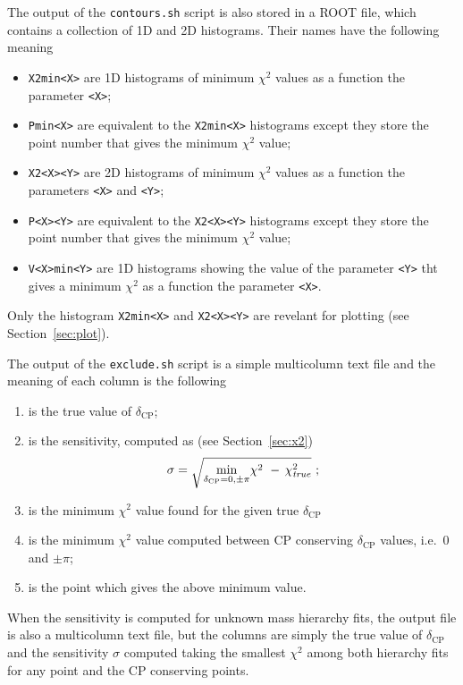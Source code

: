 \documentclass[a4paper, 11pt]{article}
\newcommand{\refsec}[1]{Section~\ref{#1}}
\begin{document}
The output of the \texttt{contours.sh} script is also stored in a ROOT file, which %
contains a collection of 1D and 2D histograms.
Their names have the following meaning
\begin{itemize}
	\item \texttt{X2min<X>} are 1D histograms of minimum $\chi^2$ values as a function %
		the parameter \texttt{<X>};
	\item \texttt{Pmin<X>} are equivalent to the \texttt{X2min<X>} histograms except they %
		store the point number that gives the minimum $\chi^2$ value;
	\item \texttt{X2<X><Y>} are 2D histograms of minimum $\chi^2$ values as a function %
		the parameters \texttt{<X>} and \texttt{<Y>};
	\item \texttt{P<X><Y>} are equivalent to the \texttt{X2<X><Y>} histograms except they %
		store the point number that gives the minimum $\chi^2$ value;
	\item \texttt{V<X>min<Y>} are 1D histograms showing the value of the parameter \texttt{<Y>} %
		tht gives a minimum $\chi^2$ as a function the parameter \texttt{<X>}.
\end{itemize}
Only the histogram \texttt{X2min<X>} and \texttt{X2<X><Y>} are revelant for plotting (see \refsec{sec:plot}).

The output of the \texttt{exclude.sh} script is a simple multicolumn text file %
and the meaning of each column is the following
\begin{enumerate}
	\item is the true value of $\delta_\text{CP}$;
	\item is the sensitivity, computed as (see \refsec{sec:x2})
		\[
			\sigma = \sqrt{\min_{\delta_\text{CP} = 0,\pm\pi}\! \chi^2\  -\,\chi^2_\text{\emph{true}}}\ ;
		\]
	\item is the minimum $\chi^2$ value found for the given true $\delta_\text{CP}$
	\item is the minimum $\chi^2$ value computed between CP conserving $\delta_\text{CP}$ values, %
		i.e.\ $0$ and $\pm\pi$;
	\item is the point which gives the above minimum value.
\end{enumerate}
When the sensitivity is computed for unknown mass hierarchy fits, the output file is %
also a multicolumn text file, but the columns are simply the true value of $\delta_\text{CP}$ %
and the sensitivity $\sigma$ computed taking the smallest $\chi^2$ among both hierarchy fits %
for any point and the CP conserving points.
\end{document}

